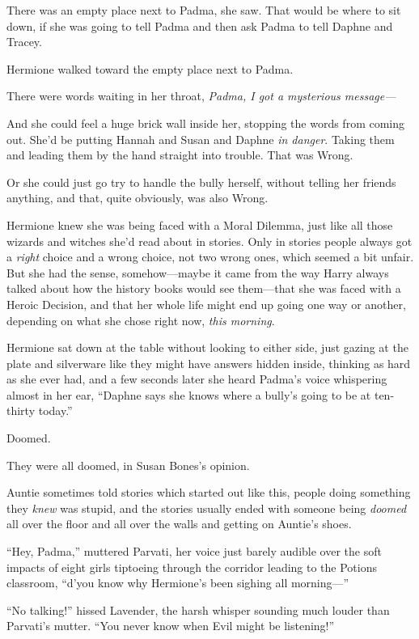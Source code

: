 There was an empty place next to Padma, she saw. That would be where to sit down, if she was going to tell Padma and then ask Padma to tell Daphne and Tracey.

Hermione walked toward the empty place next to Padma.

There were words waiting in her throat, \emph{Padma, I got a \emph{mysterious} message—}

And she could feel a huge brick wall inside her, stopping the words from coming out. She’d be putting Hannah and Susan and Daphne \emph{in danger}. Taking them and leading them by the hand straight into trouble. That was Wrong.

Or she could just go try to handle the bully herself, without telling her friends anything, and that, quite obviously, was also Wrong.

Hermione knew she was being faced with a Moral Dilemma, just like all those wizards and witches she’d read about in stories. Only in stories people always got a \emph{right} choice and a wrong choice, not two wrong ones, which seemed a bit unfair. But she had the sense, somehow—maybe it came from the way Harry always talked about how the history books would see them—that she was faced with a Heroic Decision, and that her whole life might end up going one way or another, depending on what she chose right now, \emph{this morning}.

Hermione sat down at the table without looking to either side, just gazing at the plate and silverware like they might have answers hidden inside, thinking as hard as she ever had, and a few seconds later she heard Padma’s voice whispering almost in her ear, “Daphne says she knows where a bully’s going to be at ten-thirty today.”

\later

Doomed.

They were all doomed, in Susan Bones’s opinion.

Auntie sometimes told stories which started out like this, people doing something they \emph{knew} was stupid, and the stories usually ended with someone being \emph{doomed} all over the floor and all over the walls and getting on Auntie’s shoes.

“Hey, Padma,” muttered Parvati, her voice just barely audible over the soft impacts of eight girls tiptoeing through the corridor leading to the Potions classroom, “d’you know why Hermione’s been sighing all morning—”

“No talking!” hissed Lavender, the harsh whisper sounding much louder than Parvati’s mutter. “You never know when Evil might be listening!”

